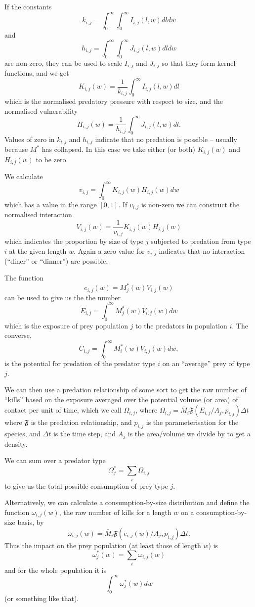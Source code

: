 If the constants
\[ k_{i,j} = \int_0^{\infty} \int_0^{\infty} I_{i,j} (l, w) dl dw \]
and
\[ h_{i,j} = \int_0^{\infty} \int_0^{\infty} J_{i,j} (l, w) dl dw \]
are non-zero, they can be used to scale $I_{i,j}$ and $J_{i,j}$ so that they
form kernel functions, and we get
\[ K_{i,j} (w) = \frac{1}{k_{i,j}} \int_0^{\infty} I_{i,j} (l, w) dl \]
which is the normalised predatory pressure with respect to size, and the
normalised vulnerability
\[ H_{i,j} (w) = \frac{1}{h_{i,j}} \int_0^{\infty} J_{i,j} (l, w) dl . \]
Values of zero in $k_{i,j}$ and $h_{i,j}$ indicate that no predation is
possible -- usually because $M^{\ast}$ has collapsed. In this case we take
either (or both) $K_{i,j} (w)$ and $H_{i,j} (w)$ to be zero.

We calculate
\[ v_{i,j} = \int_0^{\infty} K_{i,j} (w) H_{i,j} (w) dw \]
which has a value in the range $[0, 1]$. If $v_{i,j}$ is non-zero we can
construct the normalised interaction
\[ V_{i,j} (w) = \frac{1}{v_{i,j}} K_{i,j} (w) H_{i,j} (w) \]
which indicates the proportion by size of type $j$ subjected to predation from
type $i$ at the given length $w$. Again a zero value for $v_{i,j}$ indicates
that no interaction (``diner'' or ``dinner'') are possible.



The function
\[ e_{i,j} (w) = M^{\ast}_j (w) V_{i,j} (w)  \]
can be used to give us the the number
\[ E_{i,j} = \int_0^{\infty} M^{\ast}_j (w) V_{i,j} (w) d w \]
which is the exposure of prey population $j$ to the predators in
population $i$. The converse,
\[ C_{i,j} = \int_0^{\infty} M_i^{\ast} (w) V_{i,j} (w) d w, \]
is the potential for predation of the predator type $i$ on an ``average'' prey
of type $j$.

We can then use a predation relationship of some sort to get the raw
number of ``kills'' based on the exposure averaged over the potential
volume (or area) of contact per unit of time, which we call $\Omega_{i,j}$, where $\Omega_{i,j} = \bar{M}_i \mathfrak{F} (E_{i,j} / A_j,
p_{i,j}) \Delta t$ where $\mathfrak{F}$ is the predation relationship,
and $p_{i,j}$ is the parameterisation for the species, and $\Delta t$
is the time step, and $A_j$ is the area/volume we divide by to get a
density.

We can sum over a predator type
\[ \Omega_j^{\ast} = \sum_i \Omega_{i,j} \]
to give us the total possible consumption of prey type $j$.

Alternatively, we can calculate a consumption-by-size distribution and define
the function $\omega_{i,j} (w)$, the raw number of kills for a length $w$ on a
consumption-by-size basis, by
\[ \omega_{i,j} (w) = \bar{M}_i \mathfrak{F} (e_{i,j} (w) / A_j, p_{i,j})
   \Delta t. \]
Thus the impact on the prey population (at least those of length $w$) is
\[ \omega_j^{\ast} (w) = \sum_i \omega_{i,j} (w) \]
and for the whole population it is
\[ \int_0^{\infty} \omega^{\ast}_j (w) d w \]
(or something like that).

